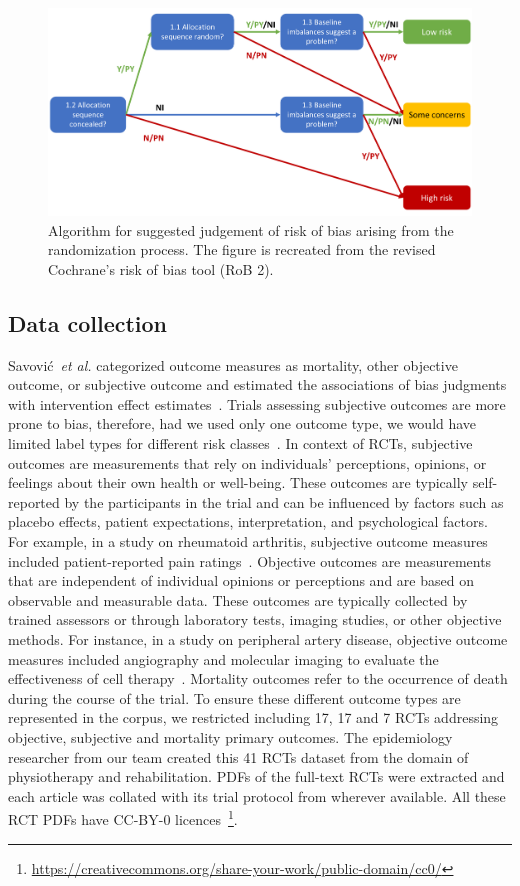 \documentclass[sn-mathphys,Numbered]{sn-jnl}%
\theoremstyle{thmstyleone}%
\theoremstyle{thmstyletwo}%
\theoremstyle{thmstylethree}%
\begin{document}
%
%
%
\begin{figure}
    \centering
    \includegraphics[width=0.80\columnwidth]{figures/flowchart.pdf}
    \caption{Algorithm for suggested judgement of risk of bias arising from the randomization process. The figure is recreated from the revised Cochrane's risk of bias tool (RoB 2).~\cite{sterne2019rob}}
    \label{fig:flowchart}
\end{figure}
%
%
%

%
%
%
\subsection{Data collection}
\label{data}
%
Savović~\textit{et al.} categorized outcome measures as mortality, other objective outcome, or subjective outcome and estimated the associations of bias judgments with intervention effect estimates~\cite{savovic2018association}.
Trials assessing subjective outcomes are more prone to bias, therefore, had we used only one outcome type, we would have limited label types for different risk classes~\cite{page2016empirical}.
In context of RCTs, subjective outcomes are measurements that rely on individuals' perceptions, opinions, or feelings about their own health or well-being.
These outcomes are typically self-reported by the participants in the trial and can be influenced by factors such as  placebo effects, patient expectations, interpretation, and psychological factors.
For example, in a study on rheumatoid arthritis, subjective outcome measures included patient-reported pain ratings~\cite{vollert2020assessment}.
Objective outcomes are measurements that are independent of individual opinions or perceptions and are based on observable and measurable data.
These outcomes are typically collected by trained assessors or through laboratory tests, imaging studies, or other objective methods.
For instance, in a study on peripheral artery disease, objective outcome measures included angiography and molecular imaging to evaluate the effectiveness of cell therapy~\cite{grimaldi2016imaging}.
Mortality outcomes refer to the occurrence of death during the course of the trial.
To ensure these different outcome types are represented in the corpus, we restricted including 17, 17 and 7 RCTs addressing objective, subjective and mortality primary outcomes.
The epidemiology researcher from our team created this 41 RCTs dataset from the domain of physiotherapy and rehabilitation.
PDFs of the full-text RCTs were extracted and each article was collated with its trial protocol from wherever available.
All these RCT PDFs have CC-BY-0 licences~\footnote{\url{https://creativecommons.org/share-your-work/public-domain/cc0/}}.
%
%
%
\end{document}
